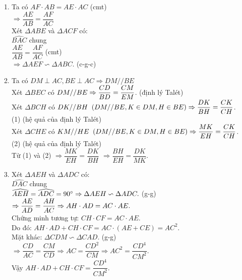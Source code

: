 \begin{ex}
{\begin{enumerate}
        	\item Ta có $AF\cdot AB=AE \cdot AC$ (cmt)\\
        			$\Rightarrow \dfrac{AE}{AB}= \dfrac{AF}{AC}$\\
        			Xét $\Delta ABE$ và $\Delta ACF$ có:\\
        			$\widehat{BAC}$ chung\\
        			$\dfrac{AE}{AB}= \dfrac{AF}{AC}$ (cmt)\\
        			$\Rightarrow \Delta AEF \backsim \Delta ABC.$ (c-g-c)
        	\item Ta có $DM\perp AC, BE\perp AC \Rightarrow DM//BE$\\
        			Xét $\Delta BEC$ có $DM//BE\\
        			\Rightarrow \dfrac{CD}{BD}=\dfrac{CM}{EM}$. (định lý Talét)\\
        			Xét $\Delta BCH$ có $DK//BH \;\;(DM//BE, K\in DM, H\in BE)\\
        			\Rightarrow \dfrac{DK}{BH}=\dfrac{CK}{CH}$. (1)  (hệ quả của định lý Talét)\\
        			Xét $\Delta CHE$ có $KM//HE \;\;(DM//BE, K\in DM, H\in BE)\\
        			\Rightarrow \dfrac{MK}{EH}=\dfrac{CK}{CH}$. (2)  (hệ quả của định lý Talét)\\
        			Từ (1) và (2) $\Rightarrow \dfrac{MK}{EH}=\dfrac{DK}{BH}$
        			$\Rightarrow \dfrac{BH}{EH}=\dfrac{DK}{MK}$.
        	\item Xét $\Delta AEH$ và $\Delta ADC$ có:\\
        			$\widehat{DAC}$ chung\\
        			$\widehat{AEH}=\widehat{ADC}=90^{\circ}\\
        			\Rightarrow \Delta AEH \backsim \Delta ADC.$ (g-g)\\
        			$\Rightarrow \dfrac{AE}{AD}=\dfrac{AH}{AC}\\
        			\Rightarrow AH\cdot AD=AC \cdot AE.$\\
        			Chứng minh tương tự: $ CH\cdot CF=AC \cdot AE.$\\
        			Do đó: $AH\cdot AD + CH\cdot CF=AC\cdot (AE+CE)=AC^2.$\\
        			Mặt khác: $\Delta CDM \backsim \Delta CAD.$ (g-g)\\
        			$\Rightarrow \dfrac{CD}{AC}=\dfrac{CM}{CD} \Rightarrow AC=\dfrac{CD^2}{CM} \Rightarrow AC^2=\dfrac{CD^4}{CM^2}$.\\
        			Vậy $AH\cdot AD + CH\cdot CF=\dfrac{CD^4}{CM^2}. $
    	\end{enumerate}
	}
\end{ex}
